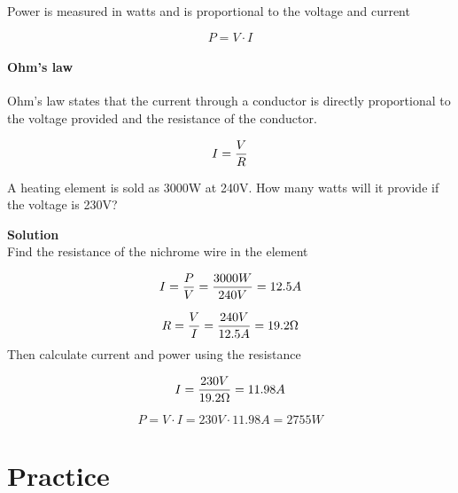 \documentclass[11pt,fleqn,openany]{book} %
\begin{document}
Power is measured in watts and is proportional to the voltage and current

\begin{equation}
P = V \cdot I
\end{equation}

\subsection{Ohm's law}

Ohm's law states that the current through a conductor is directly proportional to the voltage provided and the resistance of the conductor.

\begin{equation}
I = {V \over R}
\end{equation}

\begin{exercise}
A heating element is sold as 3000W at 240V. How many watts will it provide if the voltage is 230V?

\textbf{Solution}\\
Find the resistance of the nichrome wire in the element

\begin{equation*}
I = {P \over V} = {3000W \over 240V} = 12.5A
\end{equation*}

\begin{equation*}
R = {V \over I} = {240V \over 12.5A} = 19.2 \Omega
\end{equation*}
Then calculate current and power using the resistance

\begin{equation*}
I = {230V \over 19.2 \Omega} = 11.98A
\end{equation*}

\begin{equation*}
P = V \cdot I = 230V \cdot 11.98A = 2755W
\end{equation*}

\end{exercise}


\part{Practice}
\end{document}
